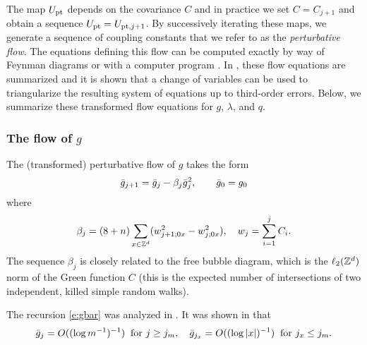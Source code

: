 
The map $U_{\rm pt}$ depends on the covariance $C$ and
in practice we set $C = C_{j+1}$ and obtain a sequence $U_{\rm pt} = U_{\mathrm{pt},j+1}$.
By successively iterating these maps, we generate a sequence of coupling constants that
we refer to as the \emph{perturbative flow}. The equations defining this flow can be
computed exactly by way of Feynman diagrams or with a computer program \cite{BBS-rg-ptsoft}.
In \cite{BBS-rg-pt}, these flow equations are summarized and it is shown that a change of
variables can be used to triangularize the resulting system of equations up to third-order
errors. Below, we summarize these transformed flow equations for $g$, $\lambda$, and $q$.

\subsubsection{The flow of \texorpdfstring{$g$}{g}}

The (transformed) perturbative flow of $g$ takes the form
\begin{equation}
\label{e:gbar}
\bar{g}_{j+1}
	=
\bar{g}_j - \beta_j  \bar{g}_j^{2}, \qquad \bar{g}_0
	=
g_0
\end{equation}
where
\begin{equation}
\beta_j = (8 + n) \sum_{x\in{ {{\mathbb Z}}^d }} (w_{j+1;0x}^2 - w_{j;0x}^2),
	\quad
w_j = \sum_{i=1}^j C_i.
\end{equation}
The sequence $\beta_j$ is closely related to the free bubble diagram,
which is the $\ell_2({ {{\mathbb Z}}^d })$ norm of the Green function $C$ (this is
the expected number of intersections of two independent, killed simple
random walks).

The recursion \eqref{e:gbar} was analyzed in \cite{BBS-rg-pt}. It was shown in
\cite[Proposition~\ref{log-prop:approximate-flow}]{BBS-saw4-log}
that
\begin{equation}
\label{e:gjxgjmbd}
\bar{g}_{j}
	=
O((\log m^{-1})^{-1}) \;\; \text{for $j \geq j_m$},
	\quad
\bar{g}_{j_x}
	=
O((\log |x|)^{-1}) \;\; \text{for $j_x \leq j_m$.}
\end{equation}

